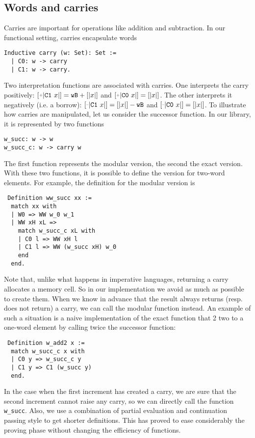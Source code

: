 \subsection{Words and carries}

Carries are important for operations like addition and subtraction.
In our functional setting, carries encapsulate words
\begin{verbatim}
Inductive carry (w: Set): Set :=
  | C0: w -> carry
  | C1: w -> carry.
\end{verbatim}
Two interpretation functions are associated with carries.
One interprets the carry positively: $\ICP{\CI x} = \wB + [|x|]$ and
$\ICP{\CO x} = [|x|]$. 
The other interprets it negatively (i.e. a borrow):
$\ICM{\CI x} = [|x|] - \wB$ and $\ICM{\CO x} = [|x|]$.
To illustrate how carries are manipulated, let us consider the successor function.
In our library, it is represented by two functions
\begin{verbatim}
w_succ: w -> w
w_succ_c: w -> carry w
\end{verbatim}
The first function represents the modular version, the second the exact 
version. With these two functions, it is possible to define the version
for two-word elements. For example, the definition for the modular version is
\begin{verbatim}
 Definition ww_succ xx :=
  match xx with
  | W0 => WW w_0 w_1
  | WW xH xL =>
    match w_succ_c xL with
    | C0 l => WW xH l
    | C1 l => WW (w_succ xH) w_0
    end
  end.
\end{verbatim}
Note that, unlike what happens in imperative languages, returning
a carry allocates a memory cell. So in our implementation
we avoid as much as possible to create them. When we know in advance 
that the result always returns (resp. does not return) a carry, we can call the modular function instead. 
An example of such a situation is a naive implementation of the exact function that 2 two to a 
one-word element by calling twice the successor function:
\begin{verbatim}
 Definition w_add2 x :=
  match w_succ_c x with
  | C0 y => w_succ_c y
  | C1 y => C1 (w_succ y)
  end.
\end{verbatim}
In the case when the first increment has created a carry, we are sure that the second
increment cannot raise any carry, so we can directly call the function {\tt w\_succ}.
Also, we use a combination of partial evaluation and continuation passing style to get
shorter definitions. This has proved to ease considerably the proving phase without
changing the efficiency of functions.

